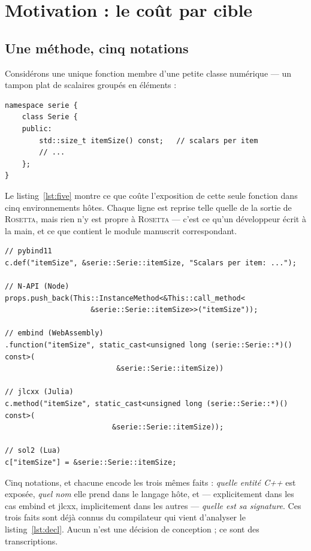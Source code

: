 \documentclass[11pt,a4paper]{article}
\newcommand{\rosetta}{\textsc{Rosetta}}
\begin{document}
\section{Motivation : le coût par cible}
\label{sec:motivation}

\subsection{Une méthode, cinq notations}

Considérons une unique fonction membre d'une petite classe numérique --- un
tampon plat de scalaires groupés en éléments :

\begin{lstlisting}[caption={La déclaration. Tout ce qui suit en est dérivé.},label={lst:decl}]
namespace serie {
    class Serie {
    public:
        std::size_t itemSize() const;   // scalars per item
        // ...
    };
}
\end{lstlisting}

Le listing~\ref{lst:five} montre ce que coûte l'exposition de cette seule
fonction dans cinq environnements hôtes. Chaque ligne est reprise telle quelle
de la sortie de \rosetta, mais rien n'y est propre à \rosetta{} --- c'est ce
qu'un développeur écrit à la main, et ce que contient le module manuscrit
correspondant.

\begin{lstlisting}[caption={La même fonction membre, cinq fois.},label={lst:five}]
// pybind11
c.def("itemSize", &serie::Serie::itemSize, "Scalars per item: ...");

// N-API (Node)
props.push_back(This::InstanceMethod<&This::call_method<
                    &serie::Serie::itemSize>>("itemSize"));

// embind (WebAssembly)
.function("itemSize", static_cast<unsigned long (serie::Serie::*)() const>(
                          &serie::Serie::itemSize))

// jlcxx (Julia)
c.method("itemSize", static_cast<unsigned long (serie::Serie::*)() const>(
                         &serie::Serie::itemSize));

// sol2 (Lua)
c["itemSize"] = &serie::Serie::itemSize;
\end{lstlisting}

Cinq notations, et chacune encode les trois mêmes faits : \emph{quelle entité
C++} est exposée, \emph{quel nom} elle prend dans le langage hôte, et ---
explicitement dans les cas embind et jlcxx, implicitement dans les autres ---
\emph{quelle est sa signature}. Ces trois faits sont déjà connus du compilateur
qui vient d'analyser le listing~\ref{lst:decl}. Aucun n'est une décision de
conception ; ce sont des transcriptions.
\end{document}
